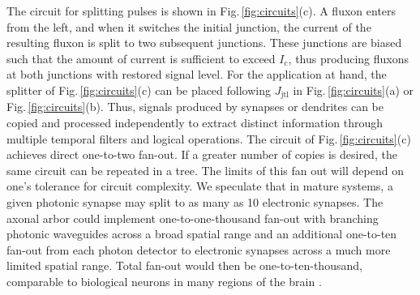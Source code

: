 \documentclass[twocolumn]{article}
\begin{document}
The circuit for splitting pulses is shown in Fig.\,\ref{fig:circuits}(c). A fluxon enters from the left, and when it switches the initial junction, the current of the resulting fluxon is split to two subsequent junctions. These junctions are biased such that the amount of current is sufficient to exceed $I_{\mathrm{c}}$, thus producing fluxons at both junctions with restored signal level. For the application at hand, the splitter of Fig.\,\ref{fig:circuits}(c) can be placed following $J_{\mathrm{jtl}}$ in Fig.\,\ref{fig:circuits}(a) or Fig.\,\ref{fig:circuits}(b). Thus, signals produced by synapses or dendrites can be copied and processed independently to extract distinct information through multiple temporal filters and logical operations. The circuit of Fig.\,\ref{fig:circuits}(c) achieves direct one-to-two fan-out. If a greater number of copies is desired, the same circuit can be repeated in a tree. The limits of this fan out will depend on one's tolerance for circuit complexity. We speculate that in mature systems, a given photonic synapse may split to as many as 10 electronic synapses. The axonal arbor could implement one-to-one-thousand fan-out with branching photonic waveguides across a broad spatial range and an additional one-to-ten fan-out from each photon detector to electronic synapses across a much more limited spatial range. Total fan-out would then be one-to-ten-thousand, comparable to biological neurons in many regions of the brain \cite{brsc1998}.
\end{document}
